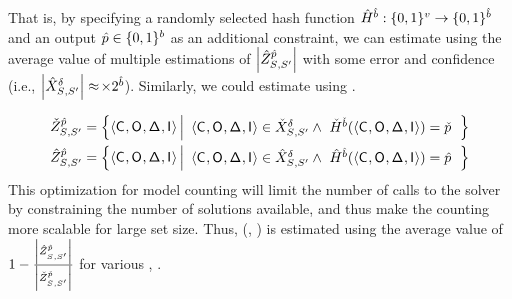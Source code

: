 That is, by specifying a randomly selected hash function
$\hat{H}^{\hat{b}}:
\{0,1\}^{v} \rightarrow
\{0,1\}^{\hat{b}}$ and an output
$\hat{p} \in
\{0,1\}^{b}$ as an additional constraint, we can
estimate
\setSize{\possibleTriplesIntersectWithDeclass{\secretsSet{}}{\secretsSetAlt{}}}
using the average value of multiple estimations of
$\left|{\hat{Z}^{\hat{p}}_{{S_{}},{S_{}'}}}\right|$
with some error \error and confidence \confidence (i.e.,
$\left|{\hat{X}^{\delta}_{{S_{}},{S_{}'}}}\right|
\approx $\setSize{\IntersectWithDeclassSubset{\secretsSet{}}{\secretsSetAlt{}}{\hashFnOutputPrefixForIntersect}}$
\times 2^{\hat{b}}$).  Similarly, we
could estimate
\setSize{\possibleTriplesUnionWithDeclass{\secretsSet{}}{\secretsSetAlt{}}}
using
\UnionWithDeclassSubset{\secretsSet{}}{\secretsSetAlt{}}{\hashFnOutputPrefixForUnion}.

\begin{align}
\UnionWithDeclassSubset{\secretsSet{}}{\secretsSetAlt{}}{\hashFnOutputPrefixForIntersect}&= \left\{
\langle \ACIFn{},\AOOFn{},\DCFn{},\AIIFn{}\rangle 
 \left|\begin{array}{r}
\langle \ACIFn{},\AOOFn{},\DCFn{},\AIIFn{}\rangle 
\in \possibleTriplesUnionWithDeclass{\secretsSet{}}{\secretsSetAlt{}}
\wedge~\hfill 
\hashPrefixFnForUnion{\hashFnOutputPrefixBitsForUnion}(\langle \ACIFn{},\AOOFn{},\DCFn{},\AIIFn{}\rangle 
)=\hashFnOutputPrefixForUnion
\end{array}
\right.\right\}\\
\IntersectWithDeclassSubset{\secretsSet{}}{\secretsSetAlt{}}{\hashFnOutputPrefixForIntersect}&= \left\{
\langle \ACIFn{},\AOOFn{},\DCFn{},\AIIFn{}\rangle 
 \left|\begin{array}{r}
\langle \ACIFn{},\AOOFn{},\DCFn{},\AIIFn{}\rangle 
 \in \possibleTriplesIntersectWithDeclass{\secretsSet{}}{\secretsSetAlt{}} 
\wedge~\hfill
 \hashPrefixFnForIntersect{\hashFnOutputPrefixBitsForIntersect}(\langle \ACIFn{},\AOOFn{},\DCFn{},\AIIFn{}\rangle)=\hashFnOutputPrefixForIntersect
 \end{array}
\right.\right\}
\end{align}
This optimization for model counting will limit the number of calls to
the \sat solver by constraining the number of solutions available, and
thus make the counting more scalable for large set size. Thus,
\JaccardWithDeclass{}(\secretsSet{}, \secretsSetAlt{})
is estimated using the average value of
$1-\frac{\left|{\hat{Z}^{\hat{p}}_{{S_{}},{S_{}'}}}\right|}
{\left|{\check{Z}^{\check{p}}_{{S_{}},{S_{}'}}}\right|}$ for various \hashFnOutputPrefixForIntersect,
\hashFnOutputPrefixForUnion.


